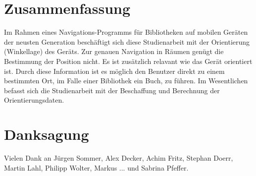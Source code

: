 \documentclass[twoside,12pt,a4paper]{report}
\begin{document}
\section*{Zusammenfassung}

Im Rahmen eines Navigations-Programms für Bibliotheken auf mobilen Geräten der neusten Generation beschäftigt sich diese Studienarbeit mit der Orientierung (Winkellage) des Geräts. Zur genauen Navigation in Räumen genügt die Bestimmung der Position nicht. Es ist zusätzlich relavant wie das Gerät orientiert ist. Durch diese Information ist es möglich den Benutzer direkt zu einem bestimmten Ort, im Falle einer Bibliothek ein Buch, zu führen. Im Wesentlichen befasst sich die Studienarbeit mit der Beschaffung und Berechnung der Orientierungsdaten.

\newpage
\section*{Danksagung}

Vielen Dank an Jürgen Sommer, Alex Decker, Achim Fritz, Stephan Doerr, Martin Lahl, Philipp Wolter, Markus ... und Sabrina Pfeffer.

\cleardoublepage


\renewcommand{\baselinestretch}{1.3}
\small\normalsize

\tableofcontents

\renewcommand{\baselinestretch}{1}
\small\normalsize

\cleardoublepage


\renewcommand{\baselinestretch}{1.3}
\small\normalsize

\listoffigures

\renewcommand{\baselinestretch}{1}
\small\normalsize

\cleardoublepage

\end{document}
